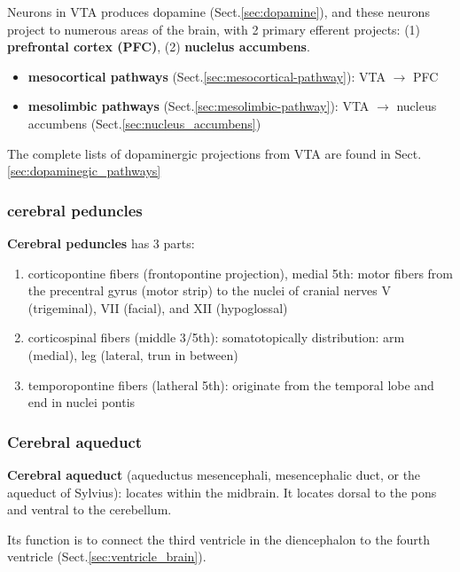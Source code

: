 Neurons in VTA produces dopamine (Sect.\ref{sec:dopamine}), and these neurons 
project to numerous areas of the brain, with 2 primary efferent projects:
(1) {\bf prefrontal cortex (PFC)}, (2) {\bf nuclelus accumbens}. 
\begin{itemize}
  \item {\bf mesocortical pathways} (Sect.\ref{sec:mesocortical-pathway}): VTA
  $\rightarrow$ PFC
  
  
  \item {\bf mesolimbic pathways} (Sect.\ref{sec:mesolimbic-pathway}): VTA
  $\rightarrow$ nucleus accumbens (Sect.\ref{sec:nucleus_accumbens})
\end{itemize}
The complete lists of dopaminergic projections from VTA are found in
Sect.\ref{sec:dopaminegic_pathways}

\subsubsection{cerebral peduncles}
\label{sec:cerebral-peduncles}

{\bf Cerebral peduncles} has 3 parts:
\begin{enumerate}
  \item  corticopontine fibers (frontopontine projection), 
  medial 5th: motor fibers from the precentral gyrus (motor strip)
  to the nuclei of cranial nerves V (trigeminal), VII (facial), and XII
  (hypoglossal)
  
  \item corticospinal fibers (middle 3/5th):
  somatotopically distribution: arm (medial), leg (lateral, trun in between)
   
  
  \item temporopontine  fibers (latheral 5th): originate from the temporal lobe
  and end in nuclei pontis
 
\end{enumerate}


\subsubsection{Cerebral aqueduct}
\label{sec:cerebral_aqueduct}
{\bf Cerebral aqueduct} (aqueductus mesencephali, mesencephalic duct, or the
aqueduct of Sylvius): locates within the midbrain. 
It locates dorsal to the pons and ventral to the cerebellum.

Its function is to connect the third ventricle in the diencephalon to the fourth
ventricle (Sect.\ref{sec:ventricle_brain}).

